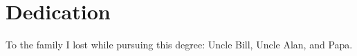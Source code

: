 
\cleartorecto %
\chapter{Dedication}
\thispagestyle{plain} %
\begin{center}
To the family I lost while pursuing this degree: Uncle Bill, Uncle Alan, and Papa.
\end{center}